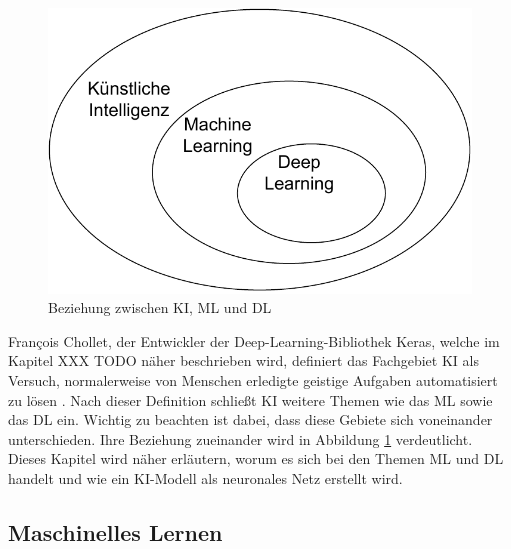 \begin{figure}
    \includegraphics[width=\textwidth/2]{abbildungen/KI_ML_DL.pdf}
    \caption{Beziehung zwischen \ac{KI}, \ac{ML} und \ac{DL} \cite[vgl. S.22]{DL_PY}}
    \label{fig:KI_ML_DL}

\end{figure} 

François Chollet, der Entwickler der Deep-Learning-Bibliothek Keras, welche im Kapitel XXX TODO näher beschrieben wird, definiert
das Fachgebiet \ac{KI} als \glqq [den] Versuch, normalerweise von Menschen erledigte geistige Aufgaben automatisiert zu lösen\grqq{} \cite[S.22]{DL_PY}.
Nach dieser Definition schließt \ac{KI} weitere Themen wie das \ac{ML} sowie das \ac{DL} ein. Wichtig zu beachten ist dabei,
dass diese Gebiete sich voneinander unterschieden. Ihre Beziehung zueinander wird in Abbildung \ref*{fig:KI_ML_DL} verdeutlicht.\\

Dieses Kapitel wird näher erläutern, worum es sich bei den Themen \ac{ML} und \ac{DL} handelt und wie ein \ac{KI}-Modell als neuronales Netz erstellt wird.

\subsection{Maschinelles Lernen}

